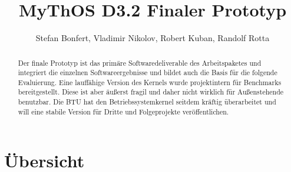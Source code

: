 

\title{MyThOS D3.2 Finaler Prototyp}
\author{Stefan Bonfert, Vladimir Nikolov, Robert Kuban, Randolf Rotta}



\maketitle

\begin{abstract}
Der finale Prototyp ist das primäre Softwaredeliverable des Arbeitspaketes und integriert die einzelnen Softwareergebnisse und bildet auch die Basis für die folgende Evaluierung. Eine lauffähige Version des Kernels wurde projektintern für Benchmarks bereitgestellt. Diese ist aber äußerst fragil und daher nicht wirklich für Außenstehende benutzbar. Die BTU hat den Betriebssystemkernel seitdem kräftig überarbeitet und will eine stabile Version für Dritte und Folgeprojekte veröffentlichen.
\end{abstract}

\newpage
\tableofcontents

\section{Übersicht}


% 
% 


